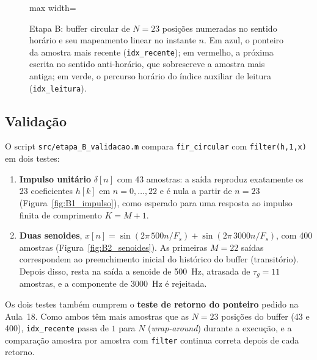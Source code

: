 \documentclass[11pt,a4paper]{article}
\begin{document}
\begin{figure}[H]
\begin{adjustbox}{max width=\textwidth}
    \end{adjustbox}
    \caption{Etapa B: buffer circular de $N = 23$ posições numeradas no sentido horário e seu mapeamento linear no instante $n$. Em azul, o ponteiro da amostra mais recente (\texttt{idx\_recente}); em vermelho, a próxima escrita no sentido anti-horário, que sobrescreve a amostra mais antiga; em verde, o percurso horário do índice auxiliar de leitura (\texttt{idx\_leitura}).}
    \label{fig:tikz_buffer}
\end{figure}

\subsection{Validação}

O script \texttt{src/etapa\_B\_validacao.m} compara \texttt{fir\_circular} com \texttt{filter(h,1,x)} em dois testes:
\begin{enumerate}[leftmargin=1.5em, itemsep=2pt]
    \item \textbf{Impulso unitário} $\delta[n]$ com 43 amostras: a saída reproduz exatamente os 23 coeficientes $h[k]$ em $n = 0, \dots, 22$ e é nula a partir de $n = 23$ (Figura~\ref{fig:B1_impulso}), como esperado para uma resposta ao impulso finita de comprimento $K = M + 1$.
    \item \textbf{Duas senoides}, $x[n] = \sin(2\pi\,500n/F_s) + \sin(2\pi\,3000n/F_s)$, com 400 amostras (Figura~\ref{fig:B2_senoides}). As primeiras $M = 22$ saídas correspondem ao preenchimento inicial do histórico do buffer (transitório). Depois disso, resta na saída a senoide de \SI{500}{Hz}, atrasada de $\tau_g = 11$ amostras, e a componente de \SI{3000}{Hz} é rejeitada.
\end{enumerate}
Os dois testes também cumprem o \textbf{teste de retorno do ponteiro} pedido na Aula~18. Como ambos têm mais amostras que as $N = 23$ posições do buffer (43 e 400), \texttt{idx\_recente} passa de $1$ para $N$ (\textit{wrap-around}) durante a execução, e a comparação amostra por amostra com \texttt{filter} continua correta depois de cada retorno.
\end{document}
